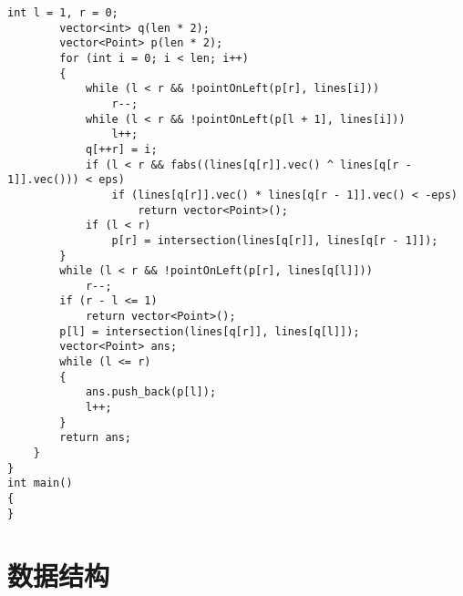 \documentclass{ctexbook}  %
\begin{document}
\begin{Verbatim}[fontsize=\small]
        int l = 1, r = 0;
        vector<int> q(len * 2);
        vector<Point> p(len * 2);
        for (int i = 0; i < len; i++)
        {
            while (l < r && !pointOnLeft(p[r], lines[i]))
                r--;
            while (l < r && !pointOnLeft(p[l + 1], lines[i]))
                l++;
            q[++r] = i;
            if (l < r && fabs((lines[q[r]].vec() ^ lines[q[r - 1]].vec())) < eps)
                if (lines[q[r]].vec() * lines[q[r - 1]].vec() < -eps)
                    return vector<Point>();
            if (l < r)
                p[r] = intersection(lines[q[r]], lines[q[r - 1]]);
        }
        while (l < r && !pointOnLeft(p[r], lines[q[l]]))
            r--;
        if (r - l <= 1)
            return vector<Point>();
        p[l] = intersection(lines[q[r]], lines[q[l]]);
        vector<Point> ans;
        while (l <= r)
        {
            ans.push_back(p[l]);
            l++;
        }
        return ans;
    }
}
int main()
{
}
\end{Verbatim}

\chapter{数据结构}
\end{document}
